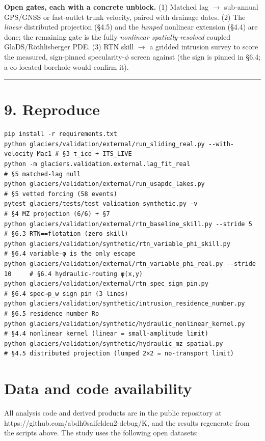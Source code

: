 \documentclass[11pt]{article}
\begin{document}
\textbf{Open gates, each with a concrete unblock.} (1) Matched lag \ensuremath{\to} sub-annual GPS/GNSS or fast-outlet trunk velocity, paired with drainage dates. (2) The \emph{linear} distributed projection (§4.5) and the \emph{lumped} nonlinear extension (§4.4) are done; the remaining gate is the fully \emph{nonlinear spatially-resolved} coupled GlaDS/Röthlisberger PDE. (3) RTN skill \ensuremath{\to} a gridded intrusion survey to score the measured, sign-pinned specularity-$\phi $ screen against (the sign is pinned in §6.4; a co-located borehole would confirm it).


\medskip\hrule\medskip


\section*{9. Reproduce}


\begin{Verbatim}
pip install -r requirements.txt
python glaciers/validation/external/run_sliding_real.py --with-velocity Mac1 # §3 τ_ice + ITS_LIVE
python -m glaciers.validation.external.lag_fit_real                          # §5 matched-lag null
python glaciers/validation/external/run_usapdc_lakes.py                      # §5 vetted forcing (58 events)
pytest glaciers/tests/test_validation_synthetic.py -v                        # §4 MZ projection (6/6) + §7
python glaciers/validation/external/rtn_baseline_skill.py --stride 5         # §6.3 RTN==flotation (zero skill)
python glaciers/validation/synthetic/rtn_variable_phi_skill.py               # §6.4 variable-φ is the only escape
python glaciers/validation/external/rtn_variable_phi_real.py --stride 10     # §6.4 hydraulic-routing φ(x,y)
python glaciers/validation/external/rtn_spec_sign_pin.py                     # §6.4 spec→p_w sign pin (3 lines)
python glaciers/validation/synthetic/intrusion_residence_number.py           # §6.5 residence number Ro
python glaciers/validation/synthetic/hydraulic_nonlinear_kernel.py            # §4.4 nonlinear kernel (linear = small-amplitude limit)
python glaciers/validation/synthetic/hydraulic_mz_spatial.py                  # §4.5 distributed projection (lumped 2×2 = no-transport limit)
\end{Verbatim}

\section*{Data and code availability}


All analysis code and derived products are in the public repository at https://github.com/abdh0saifelden2-debug/K, and the results regenerate from the scripts above. The study uses the following open datasets:
\end{document}

